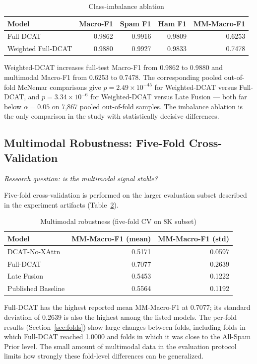 \documentclass[10pt,twoside]{article}
\begin{document}
\begin{table}[t]
\centering
\caption{Class-imbalance ablation}
\label{tab:imbalance}
\small
\begin{tabular}{lrrrr}
\toprule
Model & Macro-F1 & Spam F1 & Ham F1 & MM-Macro-F1 \\
\midrule
Full-DCAT & 0.9862 & 0.9916 & 0.9809 & 0.6253 \\
Weighted Full-DCAT & 0.9880 & 0.9927 & 0.9833 & 0.7478 \\
\bottomrule
\end{tabular}
\end{table}

Weighted-DCAT increases full-test Macro-F1 from 0.9862 to 0.9880 and multimodal Macro-F1 from 0.6253 to 0.7478. The corresponding pooled out-of-fold McNemar comparisons give $p = 2.49 \times 10^{-45}$ for Weighted-DCAT versus Full-DCAT, and $p = 3.34 \times 10^{-6}$ for Weighted-DCAT versus Late Fusion --- both far below $\alpha = 0.05$ on 7,867 pooled out-of-fold samples. The imbalance ablation is the only comparison in the study with statistically decisive differences.

\subsection{Multimodal Robustness: Five-Fold Cross-Validation}\label{sec:cv}

\emph{Research question: is the multimodal signal stable?}

Five-fold cross-validation is performed on the larger evaluation subset described in the experiment artifacts (Table~\ref{tab:cv}).

\begin{table}[t]
\centering
\caption{Multimodal robustness (five-fold CV on 8K subset)}
\label{tab:cv}
\small
\begin{tabular}{lrr}
\toprule
Model & MM-Macro-F1 (mean) & MM-Macro-F1 (std) \\
\midrule
DCAT-No-XAttn & 0.5171 & 0.0597 \\
Full-DCAT & 0.7077 & 0.2639 \\
Late Fusion & 0.5453 & 0.1222 \\
Published Baseline & 0.5564 & 0.1192 \\
\bottomrule
\end{tabular}
\end{table}

Full-DCAT has the highest reported mean MM-Macro-F1 at 0.7077; its standard deviation of 0.2639 is also the highest among the listed models. The per-fold results (Section~\ref{sec:folds}) show large changes between folds, including folds in which Full-DCAT reached 1.0000 and folds in which it was close to the All-Spam Prior level. The small amount of multimodal data in the evaluation protocol limits how strongly these fold-level differences can be generalized.
\end{document}
